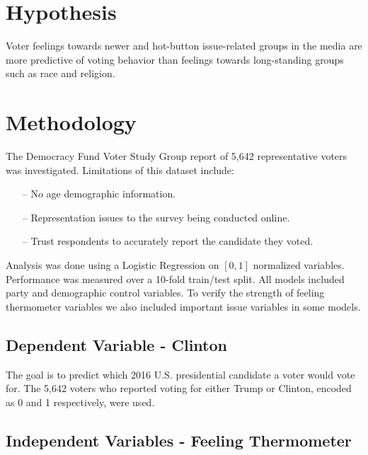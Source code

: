 \documentclass[a0,portrait]{a0poster}
\begin{document}
\begin{multicols}{2} 
\Large

\vspace{-1cm}
\section*{Hypothesis}

Voter feelings towards newer and hot-button issue-related groups in the media are more predictive of voting behavior than feelings towards long-standing groups such as race and religion.

\vspace{-1cm}
\section*{Methodology}

The Democracy Fund Voter Study Group \cite{dfvsg} report of 5,642 representative voters was investigated. Limitations of this dataset include:

\begin{itemize}[leftmargin=2cm]
\item[--] No age demographic information.
\item[--] Representation issues to the survey being conducted online.
\item[--] Trust respondents to accurately report the candidate they voted.
\end{itemize}

\noindent
Analysis was done using a Logistic Regression on $[0,1]$ normalized variables. Performance was measured over a 10-fold train/test split. All models included party and demographic control variables. To verify the strength of feeling thermometer variables we also included important issue variables in some models.

\subsection*{Dependent Variable - Clinton}

The goal is to predict which 2016 U.S. presidential candidate a voter would vote for. The 5,642 voters who reported voting for either Trump or Clinton, encoded as 0 and 1 respectively, were used.

\subsection*{Independent Variables - Feeling Thermometer}


\end{multicols}
\end{document}
